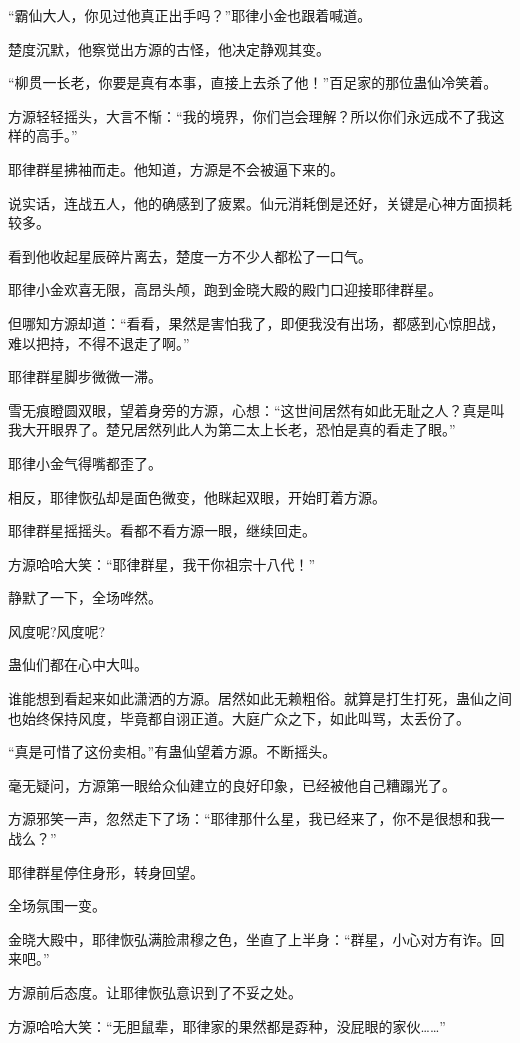 \begin{this_body}
“霸仙大人，你见过他真正出手吗？”耶律小金也跟着喊道。

楚度沉默，他察觉出方源的古怪，他决定静观其变。

“柳贯一长老，你要是真有本事，直接上去杀了他！”百足家的那位蛊仙冷笑着。

方源轻轻摇头，大言不惭：“我的境界，你们岂会理解？所以你们永远成不了我这样的高手。”

耶律群星拂袖而走。他知道，方源是不会被逼下来的。

说实话，连战五人，他的确感到了疲累。仙元消耗倒是还好，关键是心神方面损耗较多。

看到他收起星辰碎片离去，楚度一方不少人都松了一口气。

耶律小金欢喜无限，高昂头颅，跑到金晓大殿的殿门口迎接耶律群星。

但哪知方源却道：“看看，果然是害怕我了，即便我没有出场，都感到心惊胆战，难以把持，不得不退走了啊。”

耶律群星脚步微微一滞。

雪无痕瞪圆双眼，望着身旁的方源，心想：“这世间居然有如此无耻之人？真是叫我大开眼界了。楚兄居然列此人为第二太上长老，恐怕是真的看走了眼。”

耶律小金气得嘴都歪了。

相反，耶律恢弘却是面色微变，他眯起双眼，开始盯着方源。

耶律群星摇摇头。看都不看方源一眼，继续回走。

方源哈哈大笑：“耶律群星，我干你祖宗十八代！”

静默了一下，全场哗然。

风度呢?风度呢?

蛊仙们都在心中大叫。

谁能想到看起来如此潇洒的方源。居然如此无赖粗俗。就算是打生打死，蛊仙之间也始终保持风度，毕竟都自诩正道。大庭广众之下，如此叫骂，太丢份了。

“真是可惜了这份卖相。”有蛊仙望着方源。不断摇头。

毫无疑问，方源第一眼给众仙建立的良好印象，已经被他自己糟蹋光了。

方源邪笑一声，忽然走下了场：“耶律那什么星，我已经来了，你不是很想和我一战么？”

耶律群星停住身形，转身回望。

全场氛围一变。

金晓大殿中，耶律恢弘满脸肃穆之色，坐直了上半身：“群星，小心对方有诈。回来吧。”

方源前后态度。让耶律恢弘意识到了不妥之处。

方源哈哈大笑：“无胆鼠辈，耶律家的果然都是孬种，没屁眼的家伙……”


\end{this_body}
